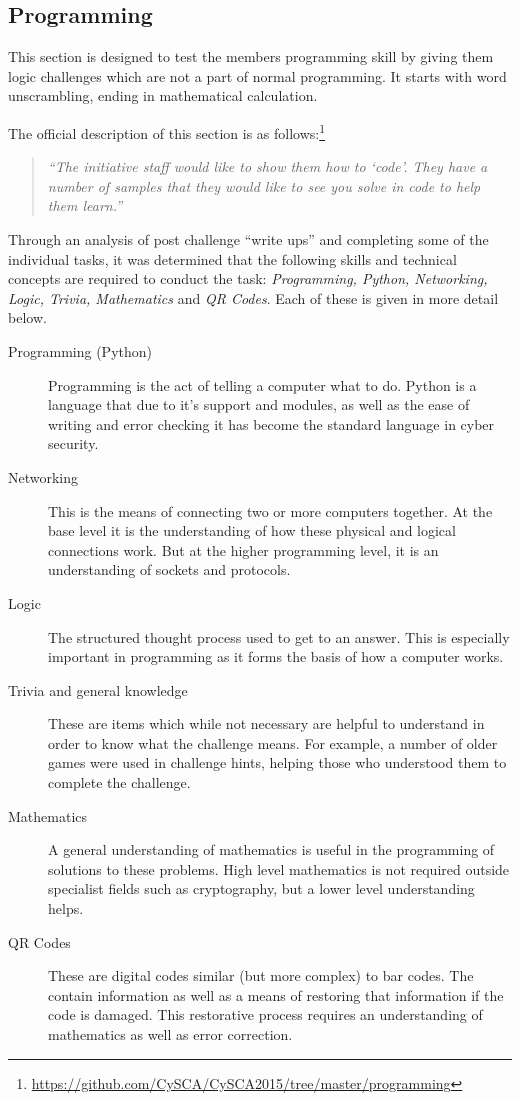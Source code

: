 \documentclass[a4paper,11pt]{report}
\begin{document}
		\subsection{Programming}
			This section is designed to test the members programming skill by giving them logic challenges which are not a part of normal programming. 
			It starts with word unscrambling, ending in mathematical calculation. 
			
			The official description of this section is as follows:\footnote{\url{https://github.com/CySCA/CySCA2015/tree/master/programming}}
			\begin{quote}
				\textit{``The initiative staff would like to show them how to `code'. They have a number of samples that they would like to see you solve in code to help them learn.''}
			\end{quote}

			Through an analysis of post challenge ``write ups'' and completing some of the individual tasks, 
			it was determined that the following skills and technical concepts are required to conduct the task: 
			\textit{Programming, Python, Networking, Logic, Trivia, Mathematics} and \textit{QR Codes}.
			Each of these is given in more detail below. 
			\begin{description}
				\item[Programming (Python)]
					Programming is the act of telling a computer what to do. 
					Python is a language that due to it's support and modules, as well as the ease of writing and error checking it has become the standard language in cyber security. 
				\item[Networking]
					This is the means of connecting two or more computers together. 
					At the base level it is the understanding of how these physical and logical connections work. 
					But at the higher programming level, it is an understanding of sockets and protocols. 
				\item[Logic]
					The structured thought process used to get to an answer. 
					This is especially important in programming as it forms the basis of how a computer works. 
				\item[Trivia and general knowledge] 
					These are items which while not necessary are helpful to understand in order to know what the challenge means. 
					For example, a number of older games were used in challenge hints, helping those who understood them to complete the challenge. 
				\item[Mathematics] 
					A general understanding of mathematics is useful in the programming of solutions to these problems. 
					High level mathematics is not required outside specialist fields such as cryptography, but a lower level understanding helps. 
				\item[QR Codes]
					These are digital codes similar (but more complex) to bar codes.
					The contain information as well as a means of restoring that information if the code is damaged. 
					This restorative process requires an understanding of mathematics as well as error correction. 
			\end{description}
\end{document}
